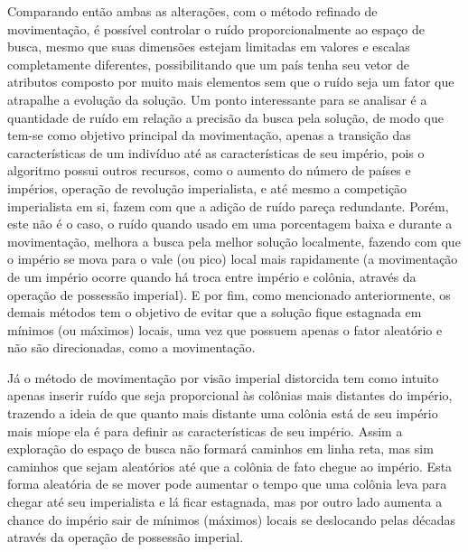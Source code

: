 Comparando então ambas as alterações, com o método refinado de movimentação, é possível controlar o ruído proporcionalmente ao espaço de busca, mesmo que suas dimensões estejam limitadas em valores e escalas completamente diferentes, possibilitando que um país tenha seu vetor de atributos composto por muito mais elementos sem que o ruído seja um fator que atrapalhe a evolução da solução. Um ponto interessante para se analisar é a quantidade de ruído em relação a precisão da busca pela solução, de modo que tem-se como objetivo principal da movimentação, apenas a transição das características de um indivíduo até as características de seu império, pois o algoritmo possui outros recursos, como o aumento do número de países e impérios, operação de revolução imperialista, e até mesmo a competição imperialista em si, fazem com que a adição de ruído pareça redundante. Porém, este não é o caso, o ruído quando usado em uma porcentagem baixa e durante a movimentação, melhora a busca pela melhor solução localmente, fazendo com que o império se mova para o vale (ou pico) local mais rapidamente (a movimentação de um império ocorre quando há troca  entre império e colônia, através da operação de possessão imperial). E por fim, como mencionado anteriormente, os demais métodos tem o objetivo de evitar que a solução fique estagnada em mínimos (ou máximos) locais, uma vez que possuem apenas o fator aleatório e não são direcionadas, como a movimentação. 

Já o método de movimentação por visão imperial distorcida tem como intuito apenas inserir ruído que seja proporcional às colônias mais distantes do império, trazendo a ideia de que quanto mais distante uma colônia está de seu império mais míope ela é para definir as características de seu império. Assim a exploração do espaço de busca não formará caminhos em linha reta, mas sim caminhos que sejam aleatórios até que a colônia de fato chegue ao império. Esta forma aleatória de se mover pode aumentar o tempo que uma colônia leva para chegar até seu imperialista e lá ficar estagnada, mas por outro lado aumenta a chance do império sair de mínimos (máximos) locais se deslocando pelas décadas através da operação de possessão imperial.

